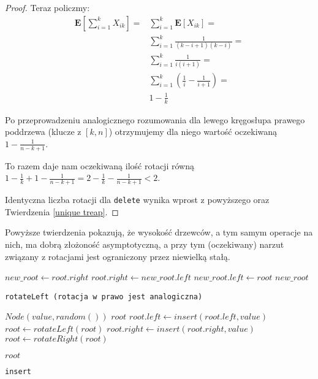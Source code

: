 \begin{proof}
Teraz policzmy:
$$
\begin{aligned}
\mathbf{E}\left[\sum_{i=1}^{k}X_{ik}\right]={}  & \sum_{i=1}^{k}\mathbf{E}\left[X_{ik}\right]= \\
& \sum_{i=1}^{k}\frac{1}{(k-i+1)(k-i)}= \\
& \sum_{i=1}^{k}\frac{1}{i(i+1)}= \\
& \sum_{i=1}^{k}(\frac{1}{i}-\frac{1}{i+1})= \\
& 1-\frac{1}{k}
\end{aligned}
$$

Po przeprowadzeniu analogicznego rozumowania dla lewego kręgosłupa prawego poddrzewa (klucze z $[k,n]$) otrzymujemy dla niego wartość oczekiwaną $1 - \frac{1}{n-k+1}$.

To razem daje nam oczekiwaną ilość rotacji równą $1 - \frac{1}{k} + 1 - \frac{1}{n-k+1} = 2 -  \frac{1}{k} - \frac{1}{n-k+1} < 2$.

Identyczna liczba rotacji dla \texttt{delete} wynika wprost z powyższego oraz Twierdzenia \ref{unique treap}.
\end{proof}

Powyższe twierdzenia pokazują, że wysokość drzewców, a tym samym operacje na nich, ma dobrą złożoność asymptotyczną, a przy tym (oczekiwany) narzut związany z rotacjami jest ograniczony przez niewielką stałą.

\newpage

\begin{algorithm}
  \DontPrintSemicolon


  $new\_root \leftarrow root.right$\;
  $root.right \leftarrow new\_root.left$\;
  $new\_root.left \leftarrow root$\;
  \Return $new\_root$\;
  
  \caption{\texttt{rotateLeft (rotacja w prawo jest analogiczna)}}
  \label{treap-rotate-left}
\end{algorithm}

\begin{algorithm}
  \DontPrintSemicolon

  {
    \Return $Node(value, random())$\;
  }
  {
    \Return $root$\;
  }
  {
    $root.left \leftarrow insert(root.left, value)$\;
    {
      $root \leftarrow rotateLeft(root)$\;
    }
  }
  {
    $root.right \leftarrow insert(root.right, value)$\;
    {
      $root \leftarrow rotateRight(root)$\;
    }
  }
  
  \Return $root$\;
  \caption{\texttt{insert}}
  \label{treap-insert}
\end{algorithm}

